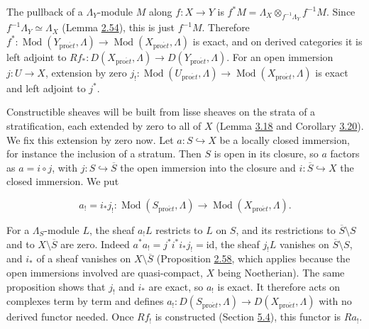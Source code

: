 \documentclass[11pt]{article}
\begin{document}
The pullback of a \(\Lambda_Y\)-module \(M\) along \(f:X\to Y\) is \(f^*M=\Lambda_X\otimes_{f^{-1}\Lambda_Y}f^{-1}M\). Since \(f^{-1}\Lambda_Y\simeq\Lambda_X\) (Lemma \hyperref[bp167]{2.54}), this is just \(f^{-1}M\). Therefore \(f^*:\operatorname{Mod}(Y_{\mathrm{pro}\acute{e}t},\Lambda)\to
\operatorname{Mod}(X_{\mathrm{pro}\acute{e}t},\Lambda)\) is exact, and on derived categories it is left adjoint to \(Rf_*:D(X_{\mathrm{pro}\acute{e}t},\Lambda)\to
D(Y_{\mathrm{pro}\acute{e}t},\Lambda)\). For an open immersion \(j:U\to X\), extension by zero \(j_!:\operatorname{Mod}(U_{\mathrm{pro}\acute{e}t},\Lambda)\to\operatorname{Mod}(X_{\mathrm{pro}\acute{e}t},\Lambda)\) is exact and left adjoint to \(j^*\).

Constructible sheaves will be built from lisse sheaves on the strata of a stratification, each extended by zero to all of \(X\) (Lemma \hyperref[bp248]{3.18} and Corollary \hyperref[bp253]{3.20}). We fix this extension by zero now. Let \(a:S\hookrightarrow X\) be a locally closed immersion, for instance the inclusion of a stratum. Then \(S\) is open in its closure, so \(a\) factors as \(a=i\circ j\), with \(j:S\hookrightarrow\overline S\) the open immersion into the closure and \(i:\overline S\hookrightarrow X\) the closed immersion. We put

\[
a_!=i_*j_!:\operatorname{Mod}(S_{\mathrm{pro}\acute{e}t},\Lambda)\longrightarrow\operatorname{Mod}(X_{\mathrm{pro}\acute{e}t},\Lambda).
\]

For a \(\Lambda_S\)-module \(L\), the sheaf \(a_!L\) restricts to \(L\) on \(S\), and its restrictions to \(\overline S\setminus S\) and to \(X\setminus\overline S\) are zero. Indeed \(a^*a_!=j^*i^*i_*j_!=\mathrm{id}\), the sheaf \(j_!L\) vanishes on \(\overline S\setminus S\), and \(i_*\) of a sheaf vanishes on \(X\setminus\overline S\) (Proposition \hyperref[bp181]{2.58}, which applies because the open immersions involved are quasi-compact, \(X\) being Noetherian). The same proposition shows that \(j_!\) and \(i_*\) are exact, so \(a_!\) is exact. It therefore acts on complexes term by term and defines \(a_!:D(S_{\mathrm{pro}\acute{e}t},\Lambda)\to D(X_{\mathrm{pro}\acute{e}t},\Lambda)\) with no derived functor needed. Once \(Rf_!\) is constructed (Section \hyperref[bp459]{5.4}), this functor is \(Ra_!\).


\end{document}
